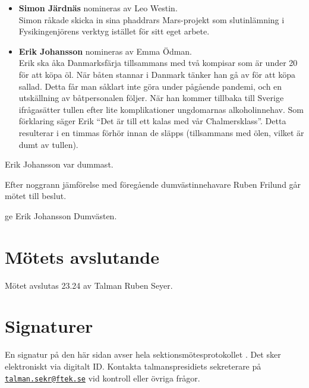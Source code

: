 \documentclass[hidelinks]{sektionsmote} %
\begin{document}
\begin{itemize}
  \item \textbf{Simon Järdnäs} nomineras av Leo Westin.\\
  Simon råkade skicka in sina phaddrars Mars-projekt som slutinlämning i Fysikingenjörens verktyg istället för sitt eget arbete. 

  \item \textbf{Erik Johansson} nomineras av Emma Ödman.\\
  Erik ska åka Danmarksfärja tillsammans med två kompisar som är under 20 för att köpa öl.
  När båten stannar i Danmark tänker han gå av för att köpa sallad.
  Detta får man såklart inte göra under pågående pandemi, och en utskällning av båtpersonalen följer.
  När han kommer tillbaka till Sverige ifrågasätter tullen efter lite komplikationer ungdomarnas alkoholinnehav.
  Som förklaring säger Erik \enquote{Det är till ett kalas med vår Chalmersklass}.
  Detta resulterar i en timmas förhör innan de släpps (tillsammans med ölen, vilket är dumt av tullen).

\end{itemize}

\begin{beslut}
  \item Erik Johansson var dummast.
\end{beslut}
Efter noggrann jämförelse med föregående dumvästinnehavare Ruben Frilund går mötet till beslut.
\begin{beslut}
  \item ge Erik Johansson Dumvästen.
\end{beslut}

\section{Mötets avslutande}
Mötet avslutas 23.24 av Talman Ruben Seyer.

\clearpage
\section*{Signaturer}
\label{sec:sig}
En signatur på den här sidan avser hela sektionsmötesprotokollet \themote. Det sker elektroniskt via digitalt ID. Kontakta talmanspresidiets sekreterare på \href{mailto:talman.sekr@ftek.se}{\texttt{talman.sekr@ftek.se}} vid kontroll eller övriga frågor. 

\vspace{4cm}
\begin{center}
\end{center}
\end{document}
